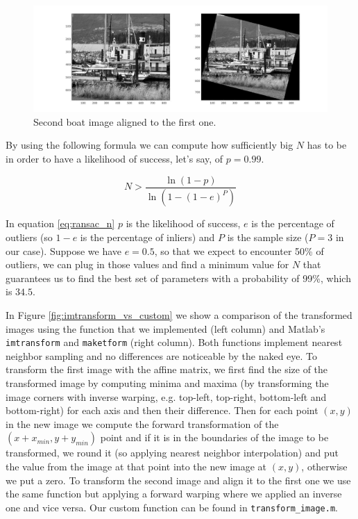 \documentclass[11pt]{article}
\begin{document}
\begin{figure}[htpb]
	\centering
	\includegraphics[width=1\textwidth]{imgs/aligned_im2.jpg}
	\caption{Second boat image aligned to the first one.}
	\label{fig:aligned_im2}
\end{figure}

By using the following formula we can compute how sufficiently big $N$ has to be
in order to have a likelihood of success, let's say, of $p = 0.99$.

\begin{equation}
	N > \frac{\ln(1 - p)}{\ln(1 - (1 - e)^P)}
	\label{eq:ransac_n}
\end{equation}

In equation \ref{eq:ransac_n} $p$ is the likelihood of success, $e$ is the
percentage of outliers (so $1 - e$ is the percentage of inliers) and $P$ is the
sample size ($P = 3$ in our case). Suppose we have $e = 0.5$, so that we expect
to encounter 50\% of outliers, we can plug in those values and find a minimum
value for $N$ that guarantees us to find the best set of parameters with a
probability of 99\%, which is $34.5$.

In Figure \ref{fig:imtransform_vs_custom} we show a comparison of the
transformed images using the function that we implemented (left column) and
Matlab's \texttt{imtransform} and \texttt{maketform} (right column). Both
functions implement nearest neighbor sampling and no differences are noticeable
by the naked eye. To transform the first image with the affine matrix, we first
find the size of the transformed image by computing minima and maxima (by
transforming the image corners with inverse warping, e.g. top-left, top-right, bottom-left and
bottom-right) for each axis and then their difference. Then for each point $(x,
y)$ in the new image we compute the forward transformation of the $(x+x_{min},
y+y_{min})$ point and if it is in the boundaries of the image to be transformed,
we round it (so applying nearest neighbor interpolation) and put the value from
the image at that point into the new image at $(x, y)$, otherwise we put a zero.
To transform the second image and align it to the first one we use the same
function but applying a forward warping where we applied an inverse one and vice
versa. Our custom function can be found in \texttt{transform\_image.m}.
\end{document}
